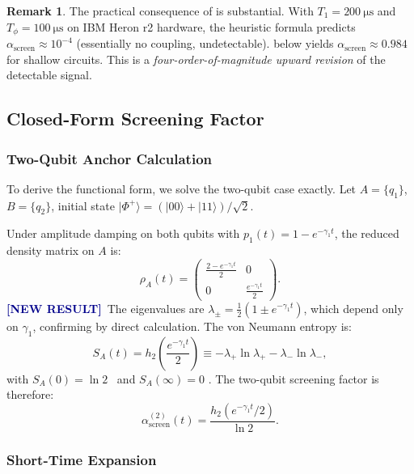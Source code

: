 \documentclass[12pt,a4paper]{article}
\newcommand{\NEW}{\textcolor{darkblue}{\textbf{[NEW RESULT]}}}
\theoremstyle{monette}
\theoremstyle{definition}
\newtheorem{remark}[theorem]{Remark}
\newcommand{\SA}{S_A}
\newcommand{\asc}{\alpha_{\mathrm{screen}}}
\newcommand{\htwo}{h_2}
\newcommand{\gamone}{\gamma_1}
\newcommand{\Tone}{T_1}
\newcommand{\Tphi}{T_\phi}
\newcommand{\rhored}{\rho_A}
\begin{document}
\begin{remark}
The practical consequence of  is substantial.
With $\Tone = \SI{200}{\micro\second}$ and $\Tphi = \SI{100}{\micro\second}$
on IBM Heron r2 hardware, the heuristic formula predicts
$\asc \approx 10^{-4}$ (essentially no coupling, undetectable).
 below yields $\asc \approx 0.984$ for shallow circuits.
This is a \emph{four-order-of-magnitude upward revision} of the detectable signal.
\end{remark}

\subsection{Closed-Form Screening Factor}
\label{sec:closed_form}

\subsubsection{Two-Qubit Anchor Calculation}

To derive the functional form, we solve the two-qubit case exactly.
Let $A = \{q_1\}$, $B = \{q_2\}$, initial state $|\Phi^+\rangle = (|00\rangle+|11\rangle)/\sqrt{2}$.

Under amplitude damping on both qubits with $p_1(t) = 1 - e^{-\gamone t}$,
the reduced density matrix on $A$ is:
\begin{equation}
  \rhored(t) = \begin{pmatrix}
    \frac{2 - e^{-\gamone t}}{2} & 0 \\
    0 & \frac{e^{-\gamone t}}{2}
  \end{pmatrix}.
  \label{eq:rhoA_2qubit}
\end{equation}
\NEW\ The eigenvalues are $\lambda_\pm = \frac{1}{2}(1 \pm e^{-\gamone t})$,
which depend only on $\gamone$, confirming  by direct calculation.
The von Neumann entropy is:
\begin{equation}
  \SA(t) = \htwo\!\left(\frac{e^{-\gamone t}}{2}\right)
    \equiv -\lambda_+\ln\lambda_+ - \lambda_-\ln\lambda_-,
  \label{eq:SA_2qubit}
\end{equation}
with $\SA(0) = \ln 2$ \checkmark\ and $\SA(\infty) = 0$ \checkmark.
The two-qubit screening factor is therefore:
\begin{equation}
  \asc^{(2)}(t) = \frac{\htwo(e^{-\gamone t}/2)}{\ln 2}.
  \label{eq:alpha_2qubit}
\end{equation}

\subsubsection{Short-Time Expansion}
\end{document}
